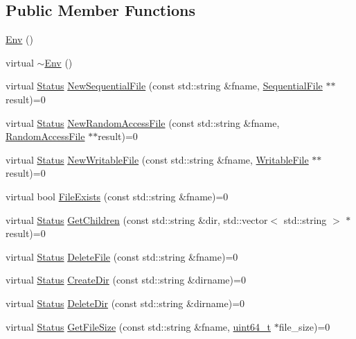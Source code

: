 \subsection*{Public Member Functions}
\begin{DoxyCompactItemize}
\item 
\hyperlink{classleveldb_1_1_env_a90f3648c740e3f5901f5843cd0dd07c4}{Env} ()
\item 
virtual \hyperlink{classleveldb_1_1_env_a2b9321c6176f8824b3ba65f0a36453fe}{$\sim$\+Env} ()
\item 
virtual \hyperlink{classleveldb_1_1_status}{Status} \hyperlink{classleveldb_1_1_env_ad73810059f48c1d7b91125d357e7d351}{New\+Sequential\+File} (const std\+::string \&fname, \hyperlink{classleveldb_1_1_sequential_file}{Sequential\+File} $\ast$$\ast$result)=0
\item 
virtual \hyperlink{classleveldb_1_1_status}{Status} \hyperlink{classleveldb_1_1_env_a1df3e0bb2d47ee914448df9bb9ca0734}{New\+Random\+Access\+File} (const std\+::string \&fname, \hyperlink{classleveldb_1_1_random_access_file}{Random\+Access\+File} $\ast$$\ast$result)=0
\item 
virtual \hyperlink{classleveldb_1_1_status}{Status} \hyperlink{classleveldb_1_1_env_a4566194f3e82fede425fdb5bb355f7de}{New\+Writable\+File} (const std\+::string \&fname, \hyperlink{classleveldb_1_1_writable_file}{Writable\+File} $\ast$$\ast$result)=0
\item 
virtual bool \hyperlink{classleveldb_1_1_env_acbb85047fdf7bf441bd365cfb09f9ecb}{File\+Exists} (const std\+::string \&fname)=0
\item 
virtual \hyperlink{classleveldb_1_1_status}{Status} \hyperlink{classleveldb_1_1_env_a53028e3112d7bb3bf6574ddaab18d6f6}{Get\+Children} (const std\+::string \&dir, std\+::vector$<$ std\+::string $>$ $\ast$result)=0
\item 
virtual \hyperlink{classleveldb_1_1_status}{Status} \hyperlink{classleveldb_1_1_env_ac956b984466d5f09309664177687f9af}{Delete\+File} (const std\+::string \&fname)=0
\item 
virtual \hyperlink{classleveldb_1_1_status}{Status} \hyperlink{classleveldb_1_1_env_ae6b7c8122df5a8020b2a3439ac39646e}{Create\+Dir} (const std\+::string \&dirname)=0
\item 
virtual \hyperlink{classleveldb_1_1_status}{Status} \hyperlink{classleveldb_1_1_env_a4e1a1c4495541e426b146cba56c59627}{Delete\+Dir} (const std\+::string \&dirname)=0
\item 
virtual \hyperlink{classleveldb_1_1_status}{Status} \hyperlink{classleveldb_1_1_env_aacb66541dcb3bd586e6cc5a87489690c}{Get\+File\+Size} (const std\+::string \&fname, \hyperlink{stdint_8h_aaa5d1cd013383c889537491c3cfd9aad}{uint64\+\_\+t} $\ast$file\+\_\+size)=0
$$
\end{DoxyCompactItemize}
